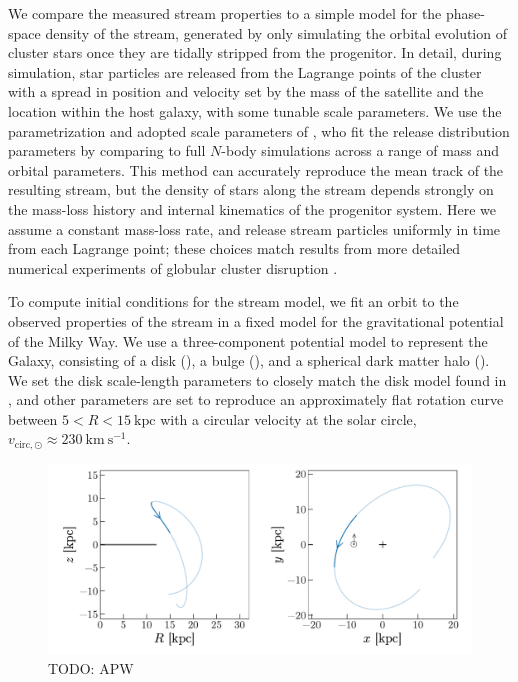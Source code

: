 \documentclass[modern]{aastex62}
\newcommand{\kpc}{\textrm{kpc}}
\newcommand{\kms}{\ensuremath{\textrm{km}~\textrm{s}^{-1}}}
\newcommand{\todo}[1]{{\color{red} TODO: #1}}
\begin{document}
We compare the measured stream properties to a simple model for the phase-space
density of the stream, generated by only simulating the orbital evolution of
cluster stars once they are tidally stripped from the progenitor.
In detail, during simulation, star particles are released from the Lagrange
points of the cluster with a spread in position and velocity set by the mass of
the satellite and the location within the host galaxy, with some tunable scale
parameters.
We use the parametrization and adopted scale parameters of \citet{Fardal:2015},
who fit the release distribution parameters by comparing to full $N$-body
simulations across a range of mass and orbital parameters.
This method can accurately reproduce the mean track of the resulting stream, but
the density of stars along the stream depends strongly on the mass-loss history
and internal kinematics of the progenitor system.
Here we assume a constant mass-loss rate, and release stream particles uniformly
in time from each Lagrange point; these choices match results from more detailed numerical experiments of globular cluster disruption \citep[e.g.,][]{Kupper:2012}.

To compute initial conditions for the stream model, we fit an orbit to the
observed properties of the stream in a fixed model for the gravitational
potential of the Milky Way.
We use a three-component potential model to represent the Galaxy, consisting of
a disk (\citealt{Miyamoto:1975}), a bulge
(\citealt{Hernquist:1990}), and a spherical dark matter halo
(\citealt{Navarro:1996}).
We set the disk scale-length parameters to closely match the disk model found in
\citet{Bovy:2015}, and other parameters are set to reproduce an approximately
flat rotation curve between $5 < R < 15~\kpc$ with a circular velocity at the
solar circle, $v_{\textrm{circ}, \odot} \approx 230~\kms$.

\begin{figure}
\begin{center}
\includegraphics[width=\textwidth]{orbitfit.pdf}
\end{center}
\caption{%
\todo{APW}
}
\label{fig:orbitfit}
\end{figure}
\end{document}
